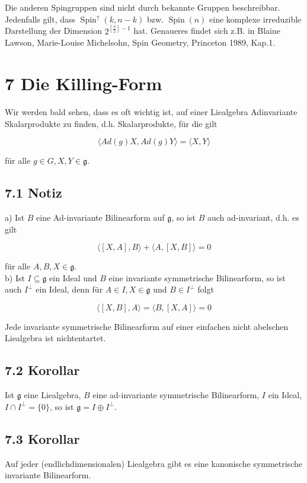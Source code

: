 \documentclass[10pt, letterpaper]{article}
\begin{document}
Die anderen Spingruppen sind nicht durch bekannte Gruppen beschreibbar. Jedenfalls gilt, dass $\operatorname{Spin}^{\uparrow}(k, n-k)$ bzw. $\operatorname{Spin}(n)$ eine komplexe irreduzible Darstellung der Dimension $2^{\left[\frac{n}{2}\right]-1}$ hat. Genaueres findet sich z.B. in Blaine Lawson, Marie-Louise Michelsohn, Spin Geometry, Princeton 1989, Kap.1.

\section*{7 Die Killing-Form}
Wir werden bald sehen, dass es oft wichtig ist, auf einer Liealgebra Adinvariante Skalarprodukte zu finden, d.h. Skalarprodukte, für die gilt

$$
\langle A d(g) X, A d(g) Y\rangle=\langle X, Y\rangle
$$

für alle $g \in G, X, Y \in \mathfrak{g}$.

\subsection*{7.1 Notiz}
a) Ist $B$ eine Ad-invariante Bilinearform auf $\mathfrak{g}$, so ist $B$ auch ad-invariant, d.h. es gilt

$$
\langle[X, A], B\rangle+\langle A,[X, B]\rangle=0
$$

für alle $A, B, X \in \mathfrak{g}$.\\
b) Ist $I \subseteq \mathfrak{g}$ ein Ideal und $B$ eine invariante symmetrische Bilinearform, so ist auch $I^{\perp}$ ein Ideal, denn für $A \in I, X \in \mathfrak{g}$ und $B \in I^{\perp}$ folgt

$$
\langle[X, B], A\rangle=\langle B,[X, A]\rangle=0
$$

Jede invariante symmetrische Bilinearform auf einer einfachen nicht abelschen Liealgebra ist nichtentartet.

\subsection*{7.2 Korollar}
Ist $\mathfrak{g}$ eine Liealgebra, $B$ eine ad-invariante symmetrische Bilinearform, $I$ ein Ideal, $I \cap I^{\perp}=\{0\}$, so ist $\mathfrak{g}=I \oplus I^{\perp}$.

\subsection*{7.3 Korollar}
Auf jeder (endlichdimensionalen) Liealgebra gibt es eine kanonische symmetrische invariante Bilinearform.
\end{document}
